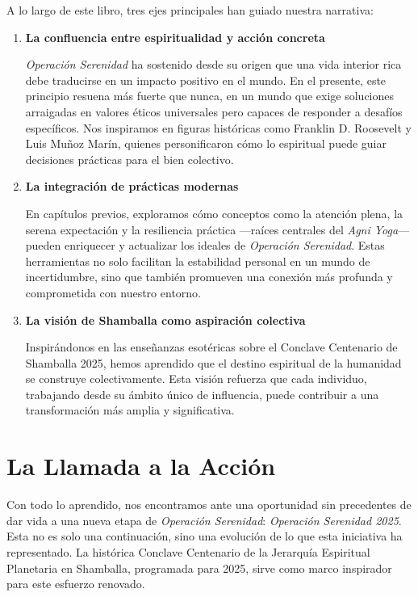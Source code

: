 \documentclass[
]{book}
\begin{document}
A lo largo de este libro, tres ejes principales han guiado nuestra narrativa:

\begin{enumerate}
\def\labelenumi{\arabic{enumi}.}
\item
  \textbf{La confluencia entre espiritualidad y acción concreta}

  \emph{Operación Serenidad} ha sostenido desde su origen que una vida interior rica debe traducirse en un impacto positivo en el mundo. En el presente, este principio resuena más fuerte que nunca, en un mundo que exige soluciones arraigadas en valores éticos universales pero capaces de responder a desafíos específicos. Nos inspiramos en figuras históricas como Franklin D. Roosevelt y Luis Muñoz Marín, quienes personificaron cómo lo espiritual puede guiar decisiones prácticas para el bien colectivo.
\item
  \textbf{La integración de prácticas modernas}

  En capítulos previos, exploramos cómo conceptos como la atención plena, la serena expectación y la resiliencia práctica ---raíces centrales del \emph{Agni Yoga}--- pueden enriquecer y actualizar los ideales de \emph{Operación Serenidad}. Estas herramientas no solo facilitan la estabilidad personal en un mundo de incertidumbre, sino que también promueven una conexión más profunda y comprometida con nuestro entorno.
\item
  \textbf{La visión de Shamballa como aspiración colectiva}

  Inspirándonos en las enseñanzas esotéricas sobre el Conclave Centenario de Shamballa 2025, hemos aprendido que el destino espiritual de la humanidad se construye colectivamente. Esta visión refuerza que cada individuo, trabajando desde su ámbito único de influencia, puede contribuir a una transformación más amplia y significativa.
\end{enumerate}

\section{La Llamada a la Acción}\label{la-llamada-a-la-acciuxf3n}

Con todo lo aprendido, nos encontramos ante una oportunidad sin precedentes de dar vida a una nueva etapa de \emph{Operación Serenidad}: \emph{Operación Serenidad 2025}. Esta no es solo una continuación, sino una evolución de lo que esta iniciativa ha representado. La histórica Conclave Centenario de la Jerarquía Espiritual Planetaria en Shamballa, programada para 2025, sirve como marco inspirador para este esfuerzo renovado.
\end{document}
